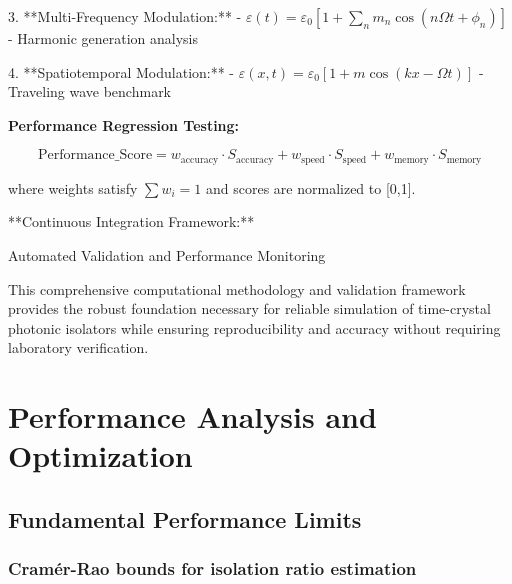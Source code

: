 \documentclass[11pt]{article}
\begin{document}
3. **Multi-Frequency Modulation:**
   - $\varepsilon(t) = \varepsilon_0[1 + \sum_n m_n\cos(n\Omega t + \phi_n)]$
   - Harmonic generation analysis

4. **Spatiotemporal Modulation:**
   - $\varepsilon(x,t) = \varepsilon_0[1 + m\cos(kx - \Omega t)]$
   - Traveling wave benchmark

\textbf{Performance Regression Testing:}

\begin{equation}
\text{Performance\_Score} = w_{\text{accuracy}} \cdot S_{\text{accuracy}} + w_{\text{speed}} \cdot S_{\text{speed}} + w_{\text{memory}} \cdot S_{\text{memory}}
\end{equation}

where weights satisfy $\sum w_i = 1$ and scores are normalized to [0,1].

**Continuous Integration Framework:**
\begin{algorithm}[H]
\SetAlgoLined
{}
\caption{Automated Validation and Performance Monitoring}
\end{algorithm}

This comprehensive computational methodology and validation framework provides the robust foundation necessary for reliable simulation of time-crystal photonic isolators while ensuring reproducibility and accuracy without requiring laboratory verification.
\section{Performance Analysis and Optimization}

\subsection{Fundamental Performance Limits}

\subsubsection{Cramér-Rao bounds for isolation ratio estimation}
\end{document}
